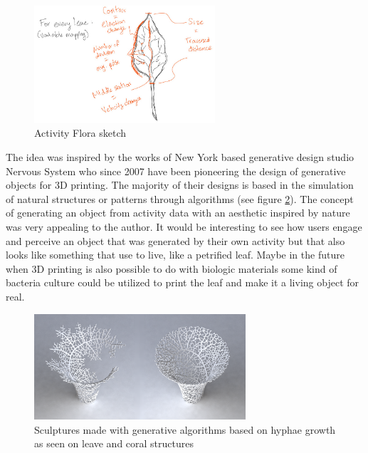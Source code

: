 \documentclass[../medieninformatik-arbeit.tex]{subfiles}
\begin{document}
\begin{figure}[h]
\captionsetup{width=0.6\textwidth}
\begin{center}
  \includegraphics[width=0.6\textwidth]{Prototype/img/ActivityFlora_detail}
  \caption{Activity Flora sketch}
\label{fig:activityflora}
\end{center}
\end{figure}

The idea was inspired by the works of New York based generative design studio Nervous System \cite{nervousStudio} who since 2007 have been pioneering the design of generative objects for 3D printing. The majority of their designs is based in the simulation of natural structures or patterns through algorithms (see figure \ref{fig:nervous}). The concept of generating an object from activity data with an aesthetic inspired by nature was very appealing to the author. It would be interesting to see how users engage and perceive an object that was generated by their own activity but that also looks like something that use to live, like a petrified leaf. Maybe in the future when 3D printing is also possible to do with biologic materials some kind of bacteria culture could be utilized to print the leaf and make it a living object for real. 

\begin{figure}[h]
\captionsetup{width=0.7\textwidth}
\begin{center}
  \includegraphics[width=0.7\textwidth]{Prototype/img/nervous}
  \caption{Sculptures made with generative algorithms based on hyphae growth as seen on leave and coral structures \cite{nervousHyphae}}
\label{fig:nervous}
\end{center}
\end{figure}
\end{document}
